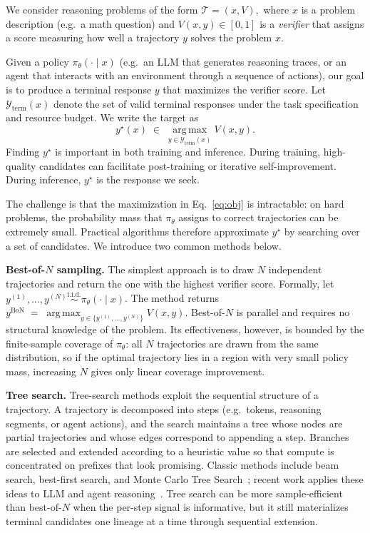 \documentclass{llmxive}
\begin{document}
We consider reasoning problems of the form
$
  \mathcal{T} = (x, V),
$
where $x$ is a problem description (e.g.\ a math question) and
$V(x,y) \in [0,1]$ is a \emph{verifier} that
assigns a score measuring how well a trajectory $y$
solves the problem $x$.

Given a policy $\pi_\theta(\cdot\mid x)$ (e.g.\ an LLM that generates reasoning traces, or an agent that interacts with an environment through a sequence of actions), our goal is to produce a terminal response $y$ that maximizes the verifier score. Let
$\mathcal{Y}_{\mathrm{term}}(x)$ denote the set of valid terminal responses
under the task specification and resource budget. We write the target as
\begin{equation}
  y^{\star}(x) \;\in\; \operatorname*{arg\,max}_{y\in\mathcal{Y}_{\mathrm{term}}(x)}
                       V(x, y).
  \label{eq:obj}
\end{equation}
Finding $y^{\star}$ is important in both training and inference. During
training, high-quality candidates can facilitate post-training or
iterative self-improvement. During inference, $y^{\star}$ is the response
we seek.

The challenge is that the maximization in Eq.~\eqref{eq:obj} is intractable:
on hard problems, the probability mass that $\pi_\theta$ assigns to correct
trajectories can be extremely small. Practical algorithms therefore
approximate $y^{\star}$ by searching over a set of candidates. We 
introduce two common methods below.

\textbf{Best-of-$N$ sampling.}
The simplest approach is to draw $N$ independent trajectories and return the one with the highest verifier score. Formally, let $y^{(1)}, \dots, y^{(N)} \overset{\text{i.i.d.}}{\sim} \pi_\theta(\cdot \mid x)$. The method returns $ y^{\mathrm{BoN}} \;=\; \operatorname*{arg\,max}_{y \in \{y^{(1)}, \dots, y^{(N)}\}} V(x, y) $.
Best-of-$N$ is parallel and requires no structural knowledge of the problem. Its effectiveness, however, is bounded by the finite-sample coverage of $\pi_\theta$: all $N$ trajectories are drawn from the same distribution, so if the optimal trajectory lies in a region with very small policy mass, increasing $N$ gives only linear coverage improvement.

\textbf{Tree search.}
Tree-search methods exploit the sequential structure of a trajectory. A trajectory
is decomposed into steps (e.g.\ tokens, reasoning segments, or agent actions), and the
search maintains a tree whose nodes are partial trajectories and whose edges
correspond to appending a step. Branches are selected and extended according
to a heuristic value so that compute is concentrated on prefixes that look
promising. Classic methods include beam search, best-first search, and Monte
Carlo Tree Search~\citep{mcts}; recent work applies these ideas to LLM and agent reasoning~\citep{tot,treegrpo}. Tree search can be more sample-efficient than best-of-$N$
when the per-step signal is informative, but it still materializes terminal
candidates one lineage at a time through sequential extension.
\end{document}
